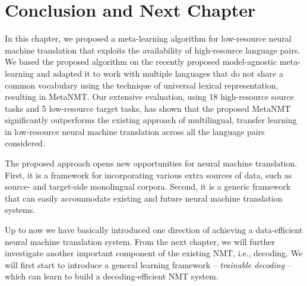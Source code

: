 


\section{Conclusion and Next Chapter}

In this chapter, we proposed a meta-learning algorithm for low-resource neural machine translation that exploits the availability of high-resource language pairs. We based the proposed algorithm on the recently proposed model-agnostic meta-learning and adapted it to work with multiple languages that do not share a common vocabulary using the technique of universal lexical representation, resulting in MetaNMT. Our extensive evaluation, using 18 high-resource source tasks and 5 low-resource target tasks, has shown that the proposed MetaNMT significantly outperforms the existing approach of multilingual, transfer learning in low-resource neural machine translation across all the language pairs considered.

The proposed approach opens new opportunities for neural machine translation. First, it is a framework for incorporating various extra sources of data, such as source- and target-side monolingual corpora. Second, it is a generic framework that can easily accommodate existing and future neural machine translation systems. 

Up to now we have basically introduced one direction of achieving a data-efficient neural machine translation system. From the next chapter, we will further investigate another important component of the existing NMT, i.e., decoding. We will first start to introduce a general learning framework -- {\it trainable decoding} --which can learn to build a decoding-efficient NMT system.